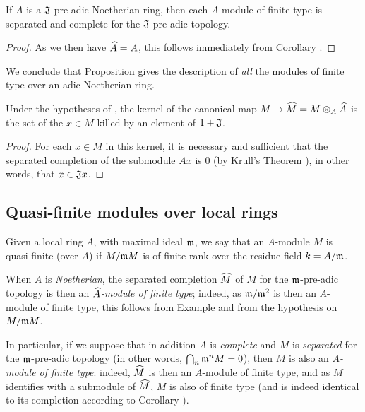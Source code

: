 \begin{cor}[7.3.6]
\label{0.7.3.6}
If $A$ is a $\mathfrak{J}$-pre-adic Noetherian ring, then each $A$-module of finite type
is separated and complete for the $\mathfrak{J}$-pre-adic topology.
\end{cor}

\begin{proof}
\label{proof-0.7.3.6}
As we then have $\widehat{A}=A$, this follows immediately from
Corollary .
\end{proof}

We conclude that Proposition  gives the description of
\emph{all} the modules of finite type over an adic Noetherian ring.

\begin{cor}[7.3.7]
\label{0.7.3.7}
Under the hypotheses of , the kernel of the canonical map
$M\to\widehat{M}=M\otimes_A\widehat{A}$ is the set of the $x\in M$ killed by an element of
$1+\mathfrak{J}$.
\end{cor}

\begin{proof}
\label{proof-0.7.3.7}
For each $x\in M$ in this kernel, it is necessary and sufficient that the separated
completion of the submodule $Ax$ is $0$
(by Krull's Theorem ), in other words, that
$x\in\mathfrak{J}x$.
\end{proof}

\subsection{Quasi-finite modules over local rings}
\label{subsection-quasi-finite-modules-over-local-rings}

\begin{defn}[7.4.1]
\label{0.7.4.1}
Given a local ring $A$, with maximal ideal $\mathfrak{m}$, we say that an $A$-module $M$
is quasi-finite (over $A$) if $M/\mathfrak{m}M$ is of finite rank over the residue field
$k=A/\mathfrak{m}$.
\end{defn}

When $A$ is \emph{Noetherian}, the separated completion $\widehat{M}$ of $M$ for the
$\mathfrak{m}$-pre-adic topology is then an \emph{$\widehat{A}$-module of finite type};
indeed, as $\mathfrak{m}/\mathfrak{m}^2$ is then an $A$-module of finite type, this follows
from Example  and from the hypothesis on $M/\mathfrak{m}M$.

In particular, if we suppose that in addition $A$ is \emph{complete} and $M$ is
\emph{separated} for the $\mathfrak{m}$-pre-adic topology (in other words,
$\bigcap_n\mathfrak{m}^n M=0$), then $M$ is also an \emph{$A$-module of finite type}: indeed,
$\widehat{M}$ is then an $A$-module of finite type, and as $M$ identifies with a submodule of
$\widehat{M}$, $M$ is also of finite type (and is indeed identical to its completion
according to Corollary ).


